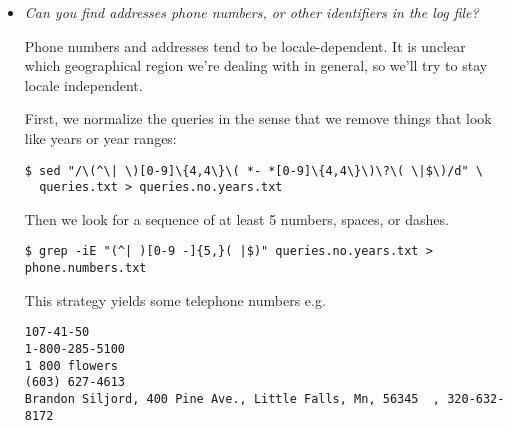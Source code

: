 \begin{itemize}





\item \emph{Can you find addresses phone numbers, or other identifiers in the
log file?}

Phone numbers and addresses tend to be locale-dependent. It is unclear which
geographical region we're dealing with in general, so we'll try to stay locale
independent.

First, we normalize the queries in the sense that we remove things that look
like years or year ranges:

\begin{lstlisting}
$ sed "/\(^\| \)[0-9]\{4,4\}\( *- *[0-9]\{4,4\}\)\?\( \|$\)/d" \
  queries.txt > queries.no.years.txt
\end{lstlisting}

Then we look for a sequence of at least 5 numbers, spaces, or dashes.

\begin{lstlisting}
$ grep -iE "(^| )[0-9 -]{5,}( |$)" queries.no.years.txt > phone.numbers.txt
\end{lstlisting}

This strategy yields some telephone numbers e.g.

\begin{lstlisting}
107-41-50
1-800-285-5100
1 800 flowers
(603) 627-4613
Brandon Siljord, 400 Pine Ave., Little Falls, Mn, 56345  , 320-632-8172
\end{lstlisting}


\end{itemize}
